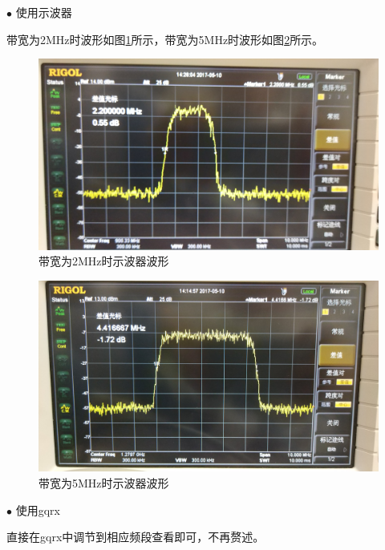 		\par $\bullet$ 使用示波器
		\par 带宽为2MHz时波形如图\ref{fig:dvbt_BW_2MHz}所示，带宽为5MHz时波形如图\ref{fig:dvbt_BW_5MHz}所示。
		\begin{figure}[htp]
			\centering
			\includegraphics[width=13cm]{figures/dvbt_BW_2MHz.jpg}
			\caption{带宽为2MHz时示波器波形}
			\label{fig:dvbt_BW_2MHz}
		\end{figure}
		\begin{figure}[htp]
			\centering
			\includegraphics[width=13cm]{figures/dvbt_BW_5MHz.jpg}
			\caption{带宽为5MHz时示波器波形}
			\label{fig:dvbt_BW_5MHz}
		\end{figure}
		\par $\bullet$ 使用gqrx
		\par 直接在gqrx中调节到相应频段查看即可，不再赘述。
